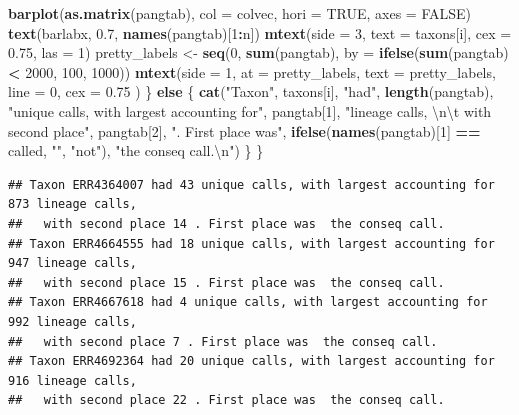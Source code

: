 \documentclass[
]{article}
\newenvironment{Shaded}{\begin{snugshade}}{\end{snugshade}}
\newcommand{\CharTok}[1]{\textcolor[rgb]{0.31,0.60,0.02}{#1}}
\newcommand{\ControlFlowTok}[1]{\textcolor[rgb]{0.13,0.29,0.53}{\textbf{#1}}}
\newcommand{\DataTypeTok}[1]{\textcolor[rgb]{0.13,0.29,0.53}{#1}}
\newcommand{\DecValTok}[1]{\textcolor[rgb]{0.00,0.00,0.81}{#1}}
\newcommand{\FloatTok}[1]{\textcolor[rgb]{0.00,0.00,0.81}{#1}}
\newcommand{\KeywordTok}[1]{\textcolor[rgb]{0.13,0.29,0.53}{\textbf{#1}}}
\newcommand{\NormalTok}[1]{#1}
\newcommand{\OperatorTok}[1]{\textcolor[rgb]{0.81,0.36,0.00}{\textbf{#1}}}
\newcommand{\OtherTok}[1]{\textcolor[rgb]{0.56,0.35,0.01}{#1}}
\newcommand{\StringTok}[1]{\textcolor[rgb]{0.31,0.60,0.02}{#1}}
\begin{document}
\begin{Shaded}
\begin{Highlighting}[]
        \KeywordTok{barplot}\NormalTok{(}\KeywordTok{as.matrix}\NormalTok{(pangtab),}
            \DataTypeTok{col =}\NormalTok{ colvec, }\DataTypeTok{hori =} \OtherTok{TRUE}\NormalTok{, }\DataTypeTok{axes =} \OtherTok{FALSE}\NormalTok{)}
        \KeywordTok{text}\NormalTok{(barlabx, }\FloatTok{0.7}\NormalTok{, }\KeywordTok{names}\NormalTok{(pangtab)[}\DecValTok{1}\OperatorTok{:}\NormalTok{n])}
        \KeywordTok{mtext}\NormalTok{(}\DataTypeTok{side =} \DecValTok{3}\NormalTok{, }\DataTypeTok{text =}\NormalTok{ taxons[i], }\DataTypeTok{cex =} \FloatTok{0.75}\NormalTok{, }\DataTypeTok{las =} \DecValTok{1}\NormalTok{)}
\NormalTok{        pretty\_labels \textless{}{-}}\StringTok{ }\KeywordTok{seq}\NormalTok{(}\DecValTok{0}\NormalTok{, }\KeywordTok{sum}\NormalTok{(pangtab),}
                \DataTypeTok{by =} \KeywordTok{ifelse}\NormalTok{(}\KeywordTok{sum}\NormalTok{(pangtab) }\OperatorTok{\textless{}}\StringTok{ }\DecValTok{2000}\NormalTok{, }\DecValTok{100}\NormalTok{, }\DecValTok{1000}\NormalTok{))}
        \KeywordTok{mtext}\NormalTok{(}\DataTypeTok{side =} \DecValTok{1}\NormalTok{,}
            \DataTypeTok{at =}\NormalTok{ pretty\_labels,}
            \DataTypeTok{text =}\NormalTok{ pretty\_labels,}
            \DataTypeTok{line =} \DecValTok{0}\NormalTok{,}
            \DataTypeTok{cex =} \FloatTok{0.75}
\NormalTok{        )}
\NormalTok{    \} }\ControlFlowTok{else}\NormalTok{ \{}
        \KeywordTok{cat}\NormalTok{(}\StringTok{"Taxon"}\NormalTok{, taxons[i], }\StringTok{"had"}\NormalTok{, }\KeywordTok{length}\NormalTok{(pangtab),}
            \StringTok{"unique calls, with largest accounting for"}\NormalTok{,}
\NormalTok{            pangtab[}\DecValTok{1}\NormalTok{], }\StringTok{"lineage calls, }\CharTok{\textbackslash{}n\textbackslash{}t}\StringTok{ with second place"}\NormalTok{,}
\NormalTok{            pangtab[}\DecValTok{2}\NormalTok{], }\StringTok{". First place was"}\NormalTok{,}
            \KeywordTok{ifelse}\NormalTok{(}\KeywordTok{names}\NormalTok{(pangtab)[}\DecValTok{1}\NormalTok{] }\OperatorTok{==}\StringTok{ }\NormalTok{called, }\StringTok{""}\NormalTok{, }\StringTok{"not"}\NormalTok{),}
            \StringTok{"the conseq call.}\CharTok{\textbackslash{}n}\StringTok{"}\NormalTok{)}
\NormalTok{    \}}
\NormalTok{\}}
\end{Highlighting}
\end{Shaded}

\begin{verbatim}
## Taxon ERR4364007 had 43 unique calls, with largest accounting for 873 lineage calls, 
##   with second place 14 . First place was  the conseq call.
## Taxon ERR4664555 had 18 unique calls, with largest accounting for 947 lineage calls, 
##   with second place 15 . First place was  the conseq call.
## Taxon ERR4667618 had 4 unique calls, with largest accounting for 992 lineage calls, 
##   with second place 7 . First place was  the conseq call.
## Taxon ERR4692364 had 20 unique calls, with largest accounting for 916 lineage calls, 
##   with second place 22 . First place was  the conseq call.
\end{verbatim}
\end{document}
